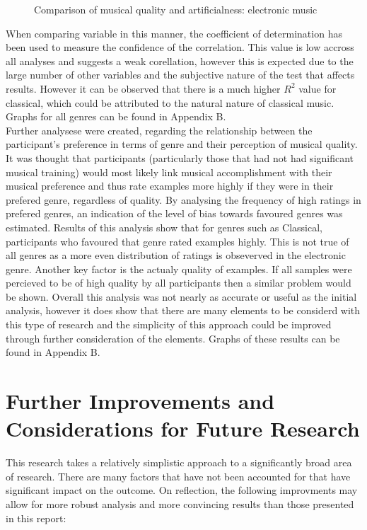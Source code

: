 \documentclass[titlepage]{scrartcl}
\begin{document}
    \begin{figure}[H]
        \caption{Comparison of musical quality and artificialness: electronic music}
        \label{emvs}
    \end{figure}

    When comparing variable in this manner, the coefficient of determination
    has been used to measure the confidence of the correlation. This value is
    low accross all analyses and suggests a weak corellation, however this is
    expected due to the large number of other variables and the subjective
    nature of the test that affects results. However it can be observed that
    there is a much higher $R^2$ value for classical, which could be attributed
    to the natural nature of classical music.
    Graphs for all genres can be found in Appendix B.\\

    Further analysese were created, regarding the relationship between the
    participant's preference in terms of genre and their perception of musical
    quality. It was thought that participants (particularly those that had not
    had significant musical training) would most likely link musical
    accomplishment with their musical preference and thus rate examples more
    highly if they were in their prefered genre, regardless of quality. By
    analysing the frequency of high ratings in prefered genres, an indication
    of the level of bias towards favoured genres was estimated. Results of this
    analysis show that for genres such as Classical, participants who favoured
    that genre rated examples highly. This is not true of all genres as a
    more even distribution of ratings is obseverved in the electronic genre.
    Another key factor is the actualy quality of examples. If all samples were
    percieved to be of high quality by all participants then a similar problem
    would be shown. Overall this analysis was not nearly as accurate or useful
    as the initial analysis, however it does show that there are many elements
    to be considerd with this type of research and the simplicity of this
    approach could be improved through further consideration of the elements.
    Graphs of these results can be found in Appendix B.

    \section{Further Improvements and Considerations for Future Research}
    This research takes a relatively simplistic approach to a significantly
    broad area of research. There are many factors that have not been accounted
    for that have significant impact on the outcome. On reflection, the
    following improvments may allow for more robust analysis and more
    convincing results than those presented in this report:
\end{document}
